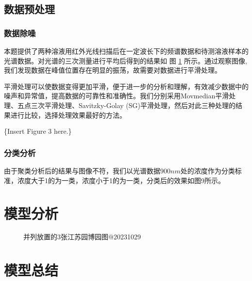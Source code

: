 \documentclass[UTF8]{ctexart}
\begin{document}
\subsection{数据预处理}
\subsubsection{数据除噪}
本题提供了两种溶液用红外光线扫描后在一定波长下的频谱数据和待测溶液样本的光谱数据。对光谱的三次测量进行平均后得到的结果如 图 \ref{fig:3} 所示。通过观察图像, 我们发现数据在峰值位置存在明显的振荡，故需要对数据进行平滑处理。

平滑处理可以使数据变得更加平滑，便于进一步的分析和理解，有效减少数据中的噪声和异常值，提高数据的可靠性和准确性。我们分别采用Movmedian平滑处理、五点三次平滑处理、Savitzky-Golay (SG)平滑处理，然后对此三种处理的结果进行比较，选择处理效果最好的方法。

\{Insert Figure 3 here.\}

\subsubsection{分类分析}
由于聚类分析后的结果与图像不符，我们以光谱数据$ 900nm $处的浓度作为分类标准，浓度大于1的为一类，浓度小于1的为一类，分类后的效果如图9所示。\par


\section{模型分析}
\begin{figure}[H]
	\centering
	\caption{并列放置的3张江苏园博园图@20231029}
	\label{fig:3}
\end{figure}

\section{模型总结}
\end{document}
